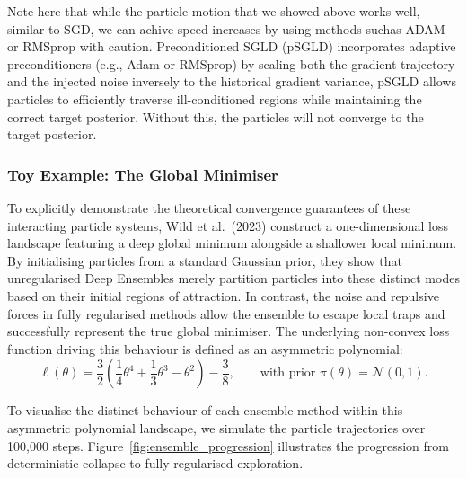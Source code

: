 \documentclass[mstat,12pt]{unswthesis}
\begin{document}
Note here that while the particle motion that we showed above works well, similar to SGD, we can achive speed increases by using methods suchas ADAM or RMSprop with caution. Preconditioned SGLD (pSGLD) \citep{li2016preconditioned} incorporates adaptive preconditioners (e.g., Adam or RMSprop) by scaling both the gradient trajectory and the injected noise inversely to the historical gradient variance, pSGLD allows particles to efficiently traverse ill-conditioned regions while maintaining the correct target posterior. Without this, the particles will not converge to the target posterior. \citep{welling2011bayesian}


\subsubsection*{Toy Example: The Global Minimiser}

To explicitly demonstrate the theoretical convergence guarantees of these interacting particle systems, Wild et al.~(2023) construct a one-dimensional loss landscape featuring a deep global minimum alongside a shallower local minimum. By initialising particles from a standard Gaussian prior, they show that unregularised Deep Ensembles merely partition particles into these distinct modes based on their initial regions of attraction. In contrast, the noise and repulsive forces in fully regularised methods allow the ensemble to escape local traps and successfully represent the true global minimiser. The underlying non-convex loss function driving this behaviour is defined as an asymmetric polynomial:
$$ \ell(\theta) = \frac{3}{2}\left(\frac{1}{4}\theta^4 + \frac{1}{3}\theta^3 - \theta^2\right) - \frac{3}{8}, \qquad \text{with prior } \pi(\theta) = \mathcal{N}(0, 1). $$

To visualise the distinct behaviour of each ensemble method within this asymmetric polynomial landscape, we simulate the particle trajectories over 100,000 steps. Figure~\ref{fig:ensemble_progression} illustrates the progression from deterministic collapse to fully regularised exploration.
\end{document}
